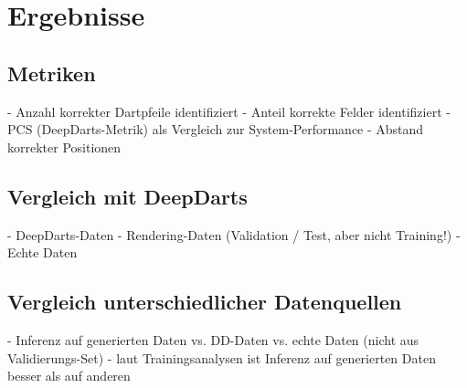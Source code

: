 
\section{Ergebnisse}
\label{sec:ki:ergebnisse}



\subsection{Metriken}
\label{sec:ki_metriken}

- Anzahl korrekter Dartpfeile identifiziert
- Anteil korrekte Felder identifiziert
- PCS (DeepDarts-Metrik) als Vergleich zur System-Performance
- Abstand korrekter Positionen



\subsection{Vergleich mit DeepDarts}
\label{seC:vergleich_dd}

- DeepDarts-Daten
- Rendering-Daten (Validation / Test, aber nicht Training!)
- Echte Daten



\subsection{Vergleich unterschiedlicher Datenquellen}
\label{sec:unterschiedliche_datenquellen}

- Inferenz auf generierten Daten vs. DD-Daten vs. echte Daten (nicht aus Validierungs-Set)
- laut Trainingsanalysen ist Inferenz auf generierten Daten besser als auf anderen

